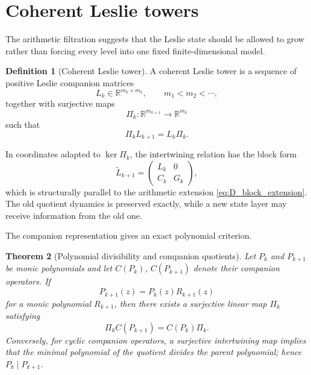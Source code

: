 \documentclass[11pt]{amsart}
\numberwithin{equation}{section}
\theoremstyle{plain}
\newtheorem{theorem}{Theorem}[section]
\theoremstyle{definition}
\newtheorem{definition}[theorem]{Definition}
\theoremstyle{remark}
\begin{document}
\section{Coherent Leslie towers}
\label{sec:coherent_leslie_towers}

The arithmetic filtration suggests that the Leslie state should be allowed to grow rather than
forcing every level into one fixed finite-dimensional model.

\begin{definition}[Coherent Leslie tower]
\label{def:coherent_leslie_tower}
A coherent Leslie tower is a sequence of positive Leslie companion matrices
\[
L_k\in\mathbb R^{m_k\times m_k},
\qquad
m_1<m_2<\cdots,
\]
together with surjective maps
\[
\Pi_k:\mathbb R^{m_{k+1}}\to\mathbb R^{m_k}
\]
such that
\begin{equation}
\boxed{\Pi_kL_{k+1}=L_k\Pi_k.}
\label{eq:leslie_intertwining}
\end{equation}
\end{definition}

In coordinates adapted to $\ker\Pi_k$, the intertwining relation has the block form
\begin{equation}
\widetilde L_{k+1}
=
\begin{pmatrix}
L_k&0\\
C_k&G_k
\end{pmatrix},
\label{eq:leslie_block_tower}
\end{equation}
which is structurally parallel to the arithmetic extension
\eqref{eq:D_block_extension}.  The old quotient dynamics is preserved exactly, while a new
state layer may receive information from the old one.

The companion representation gives an exact polynomial criterion.

\begin{theorem}[Polynomial divisibility and companion quotients]
\label{thm:companion_quotient}
Let $P_k$ and $P_{k+1}$ be monic polynomials and let $C(P_k)$,
$C(P_{k+1})$ denote their companion operators.  If
\begin{equation}
P_{k+1}(z)=P_k(z)R_{k+1}(z)
\label{eq:nested_characteristic_polynomials}
\end{equation}
for a monic polynomial $R_{k+1}$, then there exists a surjective linear map $\Pi_k$ satisfying
\[
\Pi_kC(P_{k+1})=C(P_k)\Pi_k.
\]
Conversely, for cyclic companion operators, a surjective intertwining map implies that the
minimal polynomial of the quotient divides the parent polynomial; hence
$P_k\mid P_{k+1}$.
\end{theorem}
\end{document}
